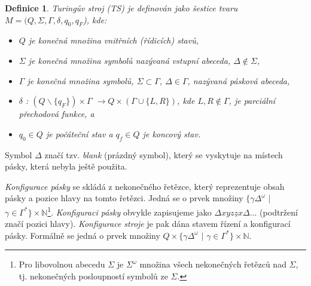 \documentclass[a4paper, 11pt, twocolumn]{article}
\begin{document}
    \newtheorem{Def1}{Definice}
    \begin{Def1}
    \label{definice_1}
        {\textnormal{Turingův stroj}} (TS) je definován jako šestice
        tvaru $M = (Q, \Sigma, \Gamma, \delta, q_0, q_F$), kde:
        
        \begin{itemize}
            \setlength\itemsep{0.05em}
            \item $Q$ je konečná množina {\textnormal{vnitřních (řídicích) stavů}},
            \item $\Sigma$ je konečná množina symbolů nazývaná  {\textnormal{vstupní
                abeceda}}, $\Delta \notin \Sigma$,
            \item $\Gamma$ je konečná množina symbolů, $\Sigma \subset \Gamma$, $\Delta \in \Gamma$,
                nazývaná {\textnormal{pásková abeceda}},
            \item $\delta$ {\textnormal{:}} $(Q \backslash \{q_F\})\times\Gamma$ $\rightarrow Q\times(\Gamma\cup\{L, R\})$, kde $L, R \notin \Gamma$, je parciální {\textnormal{přechodová funkce}}, a
            \item  $q_0 \in Q$ je {\textnormal{počáteční stav}} a $q_f \in Q$ je {\textnormal{koncový stav}}.
        \end{itemize}
    \end{Def1}
    
        Symbol $\Delta$ značí tzv. \emph{blank} (prázdný symbol), který se
        vyskytuje na místech pásky, která nebyla ještě použita.
    
        \emph{Konfigurace pásky} se skládá z nekonečného řetězce,
        který reprezentuje obsah pásky a pozice hlavy na tomto
        řetězci. Jedná se o prvek množiny $\{\gamma\Delta^{\omega}$
        $\vert$  $\gamma \in \Gamma^{\ast}\} \times \mathbb{N}$\footnote{Pro libovolnou abecedu $\Sigma$ je $\Sigma^{\omega}$ množina všech nekonečných řetězců nad $\Sigma$, tj. nekonečných posloupností symbolů ze $\Sigma$.}.
        \emph{Konfiguraci pásky} obvykle zapisujeme jako $\Delta xyz\underline{z}x\Delta$...
        (podtržení značí pozici hlavy). \emph{Konfigurace stroje} je pak
        dána stavem řízení a konfigurací pásky. Formálně se jedná
        o prvek množiny $Q \times \{\gamma\Delta^{\omega}$ $\vert$ $\gamma \in \Gamma^{\ast}\} \times \mathbb{N}$.
        
\end{document}
